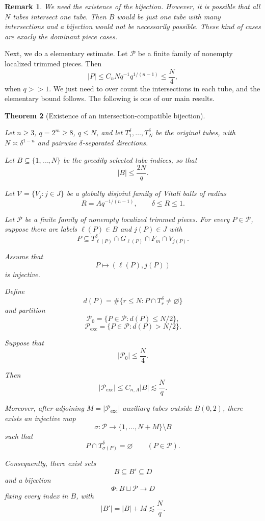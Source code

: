 \documentclass[11pt, letterpaper]{nyjm}
\newtheorem{theorem}{Theorem}[section]
\newtheorem{remark}[theorem]{Remark}
\begin{document}
	\begin{remark}
		We need the existence of the bijection. However, it is possible that all $N$ tubes intersect one tube. Then $B$ would be just one tube with many intersections and a bijection would not be necessarily possible. These kind of cases are exacly the dominant piece cases.    
	\end{remark}
	
	Next, we do a elementary estimate. Let $\mathcal P$ be a finite family of nonempty
	localized trimmed pieces. Then 
	\begin{equation} \label{eq:elementary-bound}
		|P| \leq C_nNq^{-1}q^{1/(n-1)} \leq \frac{N}{4},
	\end{equation}
	when $q >> 1.$ We just need to over count the intersections in each tube, and the elementary bound follows. The following is one of our main results. 
	
	\begin{theorem}
		[Existence of an intersection-compatible bijection]
		\label{thm:restricted-bijection}
		
		Let $n\ge3$, $q=2^m\ge8$, $q\le N$,
		and let $T_1^\delta,\ldots,T_N^\delta$
		be the original tubes, with
		$N\asymp\delta^{1-n}$ and pairwise
		$\delta$-separated directions.
		
		Let $B\subseteq\{1,\ldots,N\}$
		be the greedily selected tube indices,
		so that
		\[
		|B|\le\frac{2N}{q}.
		\]
		
		Let $\mathcal V=\{V_j:j\in J\}$
		be a globally disjoint family of
		Vitali balls of radius
		\[
		R=Aq^{-1/(n-1)},\qquad
		\delta\le R\le1.
		\]
		
		Let $\mathcal P$ be a finite family
		of nonempty localized trimmed pieces.
		For every $P\in\mathcal P$, suppose
		there are labels
		$\ell(P)\in B$ and $j(P)\in J$ with
		\[
		P\subseteq
		T_{\ell(P)}^\delta
		\cap G_{\ell(P)}
		\cap F_m\cap V_{j(P)}.
		\]
		
		Assume that
		\[
		P\longmapsto(\ell(P),j(P))
		\]
		is injective.
		
		Define
		\[
		d(P)=
		\#\{r\le N:P\cap T_r^\delta
		\ne\varnothing\}
		\]
		and partition
		\[
		\mathcal P_0=
		\{P\in\mathcal P:d(P)\le N/2\},
		\]
		\[
		\mathcal P_{\mathrm{exc}}=
		\{P\in\mathcal P:d(P)>N/2\}.
		\]
		
		Suppose that
		\[
		|\mathcal P_0|\le\frac N4.
		\]
		
		Then
		\[
		|\mathcal P_{\mathrm{exc}}|
		\le C_{n,A}|B|
		\lesssim\frac Nq.
		\]
		
		Moreover, after adjoining
		$M=|\mathcal P_{\mathrm{exc}}|$
		auxiliary tubes outside $B(0,2)$,
		there exists an injective map
		\[
		\sigma:\mathcal P\longrightarrow
		\{1,\ldots,N+M\}\setminus B
		\]
		such that
		\[
		P\cap T_{\sigma(P)}^\delta
		=\varnothing
		\qquad(P\in\mathcal P).
		\]
		
		Consequently, there exist sets
		\[
		B\subseteq B'\subseteq D
		\]
		and a bijection
		\[
		\Phi:B\sqcup\mathcal P\longrightarrow D
		\]
		fixing every index in $B$, with
		\[
		|B'|=|B|+M
		\lesssim\frac Nq.
		\]
	\end{theorem}
	
\end{document}
